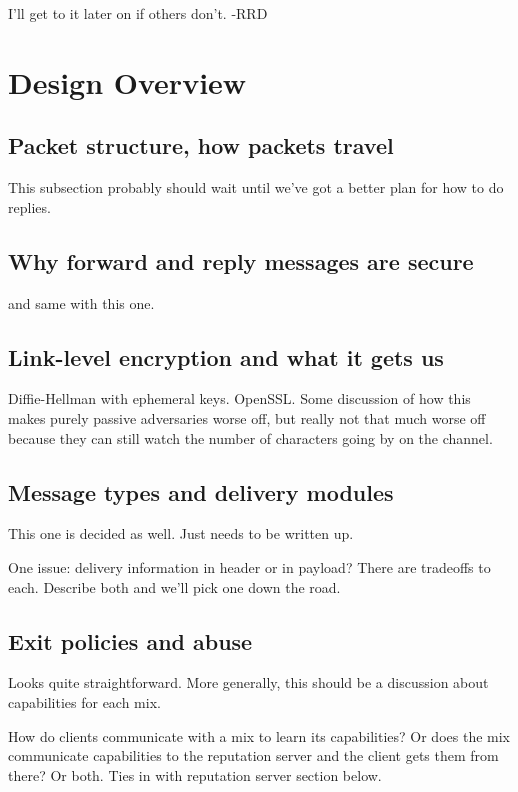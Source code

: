 \documentclass{llncs}
\begin{document}
I'll get to it later on if others don't. -RRD


\section{Design Overview}

\subsection{Packet structure, how packets travel}

This subsection probably should wait until we've got a better plan for
how to do replies.

\subsection{Why forward and reply messages are secure}

and same with this one.

\subsection{Link-level encryption and what it gets us}

Diffie-Hellman with ephemeral keys. OpenSSL. Some discussion of how
this makes purely passive adversaries worse off, but really not that
much worse off because they can still watch the number of characters
going by on the channel.

\subsection{Message types and delivery modules}

This one is decided as well. Just needs to be written up.

One issue: delivery information in header or in payload?
There are tradeoffs to each. Describe both and we'll pick one down the road.

\subsection{Exit policies and abuse}

Looks quite straightforward. More generally, this should be a discussion
about capabilities for each mix.

How do clients communicate with a mix to learn its capabilities? Or does
the mix communicate capabilities to the reputation server and the client
gets them from there? Or both. Ties in with reputation server section
below.
\end{document}
